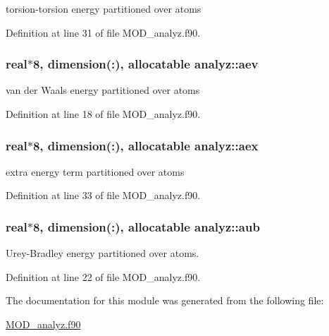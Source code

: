 torsion-\/torsion energy partitioned over atoms 



Definition at line 31 of file M\-O\-D\-\_\-analyz.\-f90.

\hypertarget{classanalyz_a094d7b549db557c404fc69d900039b5e}{
\subsubsection[{aev}]{\setlength{\rightskip}{0pt plus 5cm}real$\ast$8, dimension(\-:), allocatable analyz\-::aev}}\label{classanalyz_a094d7b549db557c404fc69d900039b5e}


van der Waals energy partitioned over atoms 



Definition at line 18 of file M\-O\-D\-\_\-analyz.\-f90.

\hypertarget{classanalyz_a8bf35580c54258544088a97228ab374d}{
\subsubsection[{aex}]{\setlength{\rightskip}{0pt plus 5cm}real$\ast$8, dimension(\-:), allocatable analyz\-::aex}}\label{classanalyz_a8bf35580c54258544088a97228ab374d}


extra energy term partitioned over atoms 



Definition at line 33 of file M\-O\-D\-\_\-analyz.\-f90.

\hypertarget{classanalyz_a813f954b0c85a8b9cbba01b4ddc4922d}{
\subsubsection[{aub}]{\setlength{\rightskip}{0pt plus 5cm}real$\ast$8, dimension(\-:), allocatable analyz\-::aub}}\label{classanalyz_a813f954b0c85a8b9cbba01b4ddc4922d}


Urey-\/\-Bradley energy partitioned over atoms. 



Definition at line 22 of file M\-O\-D\-\_\-analyz.\-f90.



The documentation for this module was generated from the following file\-:\begin{DoxyCompactItemize}
\item 
\hyperlink{MOD__analyz_8f90}{M\-O\-D\-\_\-analyz.\-f90}\end{DoxyCompactItemize}
